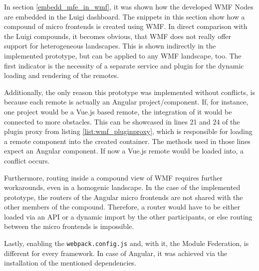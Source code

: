 In section \ref{embedd_mfe_in_wmf}, it was shown how the developed WMF Nodes are embedded in the Luigi dashboard. 
The snippets in this section show how a compound of micro frontends is created using WMF. 
In direct comparison with the Luigi compounds, it becomes obvious, that WMF does not really offer support for heterogeneous landscapes. 
This is shown indirectly in the implemented prototype, but can be applied to any WMF landscape, too. 
The first indicator is the necessity of a separate service and plugin for the dynamic loading and rendering of the remotes.

Additionally, the only reason this prototype was implemented without conflicts, is because each remote is actually an Angular project/component. 
If, for instance, one project would be a Vue.js based remote, the integration of it would be connected to more obstacles. 
This can be showcased in lines 21 and 24 of the plugin proxy from listing \ref{list:wmf_pluginproxy}, which is responsible for loading a remote component into the created container. The methods used in those lines expect an Angular component. If now a Vue.js remote would be loaded into, a conflict occurs.

Furthermore, routing inside a compound view of WMF requires further workarounds, even in a homogenic landscape. 
In the case of the implemented prototype, the routers of the Angular micro frontends are not shared with the other members of the compound. 
Therefore, a router would have to be either loaded via an API or a dynamic import by the other participants, or else routing between the micro frontends is impossible.

Lastly, enabling the \texttt{webpack.config.js} and, with it, the Module Federation, is different for every framework. 
In case of Angular, it was achieved via the installation of the mentioned dependencies.
